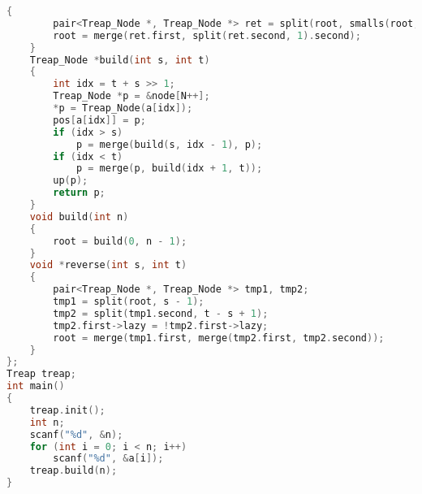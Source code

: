\begin{lstlisting}[language=c++]
	{
		pair<Treap_Node *, Treap_Node *> ret = split(root, smalls(root, value) - 1);
		root = merge(ret.first, split(ret.second, 1).second);
	}
	Treap_Node *build(int s, int t)
	{
		int idx = t + s >> 1;
		Treap_Node *p = &node[N++];
		*p = Treap_Node(a[idx]);
		pos[a[idx]] = p;
		if (idx > s)
			p = merge(build(s, idx - 1), p);
		if (idx < t)
			p = merge(p, build(idx + 1, t));
		up(p);
		return p;
	}
	void build(int n)
	{
		root = build(0, n - 1);
	}
	void *reverse(int s, int t)
	{
		pair<Treap_Node *, Treap_Node *> tmp1, tmp2;
		tmp1 = split(root, s - 1);
		tmp2 = split(tmp1.second, t - s + 1);
		tmp2.first->lazy = !tmp2.first->lazy;
		root = merge(tmp1.first, merge(tmp2.first, tmp2.second));
	}
};
Treap treap;
int main()
{
	treap.init();
	int n;
	scanf("%d", &n);
	for (int i = 0; i < n; i++)
		scanf("%d", &a[i]);
	treap.build(n);
}
	\end{lstlisting}